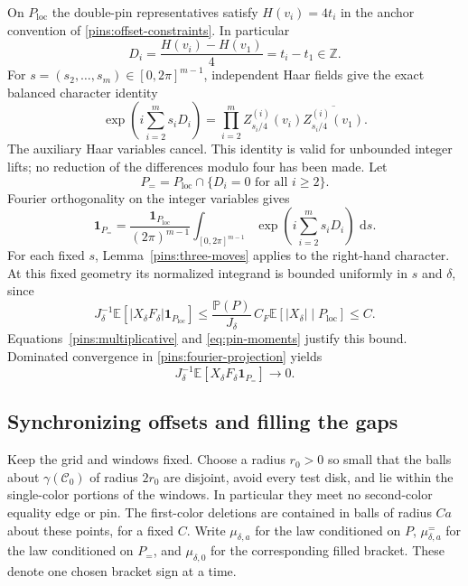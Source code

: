 \documentclass[11pt]{article}
\newcommand{\Z}{\mathbb Z}
\newcommand{\E}{\mathbb E}
\newcommand{\Prob}{\mathbb P}
\newcommand{\ind}{\mathbf 1}
\newcommand{\dd}{\,\mathrm d}
\theoremstyle{definition}
\theoremstyle{remark}
\numberwithin{equation}{section}
\begin{document}
On $P_{\mathrm{loc}}$ the double-pin representatives satisfy
$H(v_i)=4t_i$ in the anchor convention of
\eqref{pins:offset-constraints}.  In particular
\[
 D_i=\frac{H(v_i)-H(v_1)}4=t_i-t_1\in\Z.
\]
For $s=(s_2,\ldots,s_m)\in[0,2\pi]^{m-1}$, independent Haar
fields give the exact balanced character identity
\begin{equation}\label{pins:balanced-characters}
 \exp\left(i\sum_{i=2}^m s_i D_i\right)
 =\prod_{i=2}^m
 Z^{(i)}_{s_i/4}(v_i)\overline{Z^{(i)}_{s_i/4}(v_1)}.
\end{equation}
The auxiliary Haar variables cancel.  This identity is valid for
unbounded integer lifts; no reduction of the differences modulo four
has been made.  Let
\begin{equation}\label{pins:common-offset-event}
 P_= =P_{\mathrm{loc}}\cap\{D_i=0\text{ for all }i\ge2\}.
\end{equation}
Fourier orthogonality on the integer variables gives
\begin{equation}\label{pins:fourier-projection}
 \ind_{P_=}=
 \frac{\ind_{P_{\mathrm{loc}}}}{(2\pi)^{m-1}}
 \int_{[0,2\pi]^{m-1}}
       \exp\left(i\sum_{i=2}^m s_iD_i\right)\,\dd s.
\end{equation}
For each fixed $s$, Lemma~\ref{pins:three-moves} applies to the
right-hand character.  At this fixed geometry its normalized integrand
is bounded uniformly in $s$ and $\delta$, since
\[
 J_\delta^{-1}\E[|X_\delta F_\delta|\ind_{P_{\mathrm{loc}}}]
 \le \frac{\Prob(P)}{J_\delta}\,C_F
       \E[|X_\delta|\mid P_{\mathrm{loc}}]\le C.
\]
Equations~\eqref{pins:multiplicative} and \eqref{eq:pin-moments}
justify this bound.  Dominated convergence in
\eqref{pins:fourier-projection} yields
\begin{equation}\label{pins:common-offset-numerator}
 J_\delta^{-1}\E[X_\delta F_\delta\ind_{P_=}]
 \longrightarrow0.
\end{equation}

\subsection{Synchronizing offsets and filling the gaps}

Keep the grid and windows fixed.  Choose a radius $r_0>0$ so small
that the balls about $\gamma(\mathcal C_0)$ of radius $2r_0$ are
disjoint, avoid every test disk, and lie within the single-color portions
of the windows.  In particular they meet no second-color equality
edge or pin.  The first-color deletions are contained in balls of
radius $Ca$ about these points, for a fixed $C$.  Write
$\mu_{\delta,a}$ for the law conditioned on $P$,
$\mu_{\delta,a}^{=}$ for the law conditioned on $P_=$, and
$\mu_{\delta,0}$ for the corresponding filled bracket.  These denote
one chosen bracket sign at a time.
\end{document}
